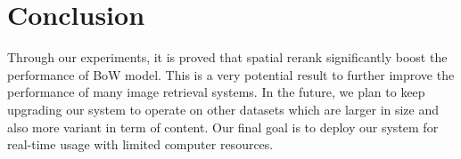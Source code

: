 \section{Conclusion}

Through our experiments, it is proved that spatial rerank significantly boost the performance of BoW model. This is a very potential result to further improve the performance of many image retrieval systems. In the future, we plan to keep upgrading our system to operate on other datasets which are larger in size and also more variant in term of content. Our final goal is to deploy our system for real-time usage with limited computer resources.
